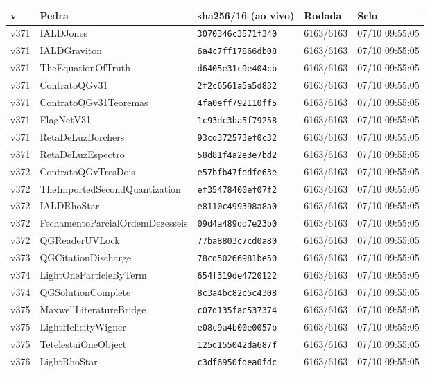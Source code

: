 \documentclass[11pt]{article}
\theoremstyle{definition}\newtheorem{deriv}{Derivação}
\begin{document}
{\small\begin{longtable}{@{}lllll@{}}\toprule v & Pedra & sha256/16 (ao vivo) & Rodada & Selo \\ \midrule\endhead 
v371 & IALDJones & \texttt{3070346c3571f340} & 6163/6163 & 07/10 09:55:05 \\
v371 & IALDGraviton & \texttt{6a4c7ff17866db08} & 6163/6163 & 07/10 09:55:05 \\
v371 & TheEquationOfTruth & \texttt{d6405e31c9e404cb} & 6163/6163 & 07/10 09:55:05 \\
v371 & ContratoQGv31 & \texttt{2f2c6561a5a5d832} & 6163/6163 & 07/10 09:55:05 \\
v371 & ContratoQGv31Teoremas & \texttt{4fa0eff792110ff5} & 6163/6163 & 07/10 09:55:05 \\
v371 & FlagNetV31 & \texttt{1c93dc3ba5f79258} & 6163/6163 & 07/10 09:55:05 \\
v371 & RetaDeLuzBorchers & \texttt{93cd372573ef0c32} & 6163/6163 & 07/10 09:55:05 \\
v371 & RetaDeLuzEspectro & \texttt{58d81f4a2e3e7bd2} & 6163/6163 & 07/10 09:55:05 \\
v372 & ContratoQGvTresDois & \texttt{e57bfb47fedfe63e} & 6163/6163 & 07/10 09:55:05 \\
v372 & TheImportedSecondQuantization & \texttt{ef35478400ef07f2} & 6163/6163 & 07/10 09:55:05 \\
v372 & IALDRhoStar & \texttt{e8110c499398a8a0} & 6163/6163 & 07/10 09:55:05 \\
v372 & FechamentoParcialOrdemDezesseis & \texttt{09d4a489dd7e23b0} & 6163/6163 & 07/10 09:55:05 \\
v372 & QGReaderUVLock & \texttt{77ba8803c7cd0a80} & 6163/6163 & 07/10 09:55:05 \\
v373 & QGCitationDischarge & \texttt{78cd50266981be50} & 6163/6163 & 07/10 09:55:05 \\
v374 & LightOneParticleByTerm & \texttt{654f319de4720122} & 6163/6163 & 07/10 09:55:05 \\
v374 & QGSolutionComplete & \texttt{8c3a4bc82c5c4308} & 6163/6163 & 07/10 09:55:05 \\
v375 & MaxwellLiteratureBridge & \texttt{c07d135fac537374} & 6163/6163 & 07/10 09:55:05 \\
v375 & LightHelicityWigner & \texttt{e08c9a4b00e0057b} & 6163/6163 & 07/10 09:55:05 \\
v375 & TetelestaiOneObject & \texttt{125d155042da687f} & 6163/6163 & 07/10 09:55:05 \\
v376 & LightRhoStar & \texttt{c3df6950fdea0fdc} & 6163/6163 & 07/10 09:55:05 \\

\end{longtable}}
\end{document}
